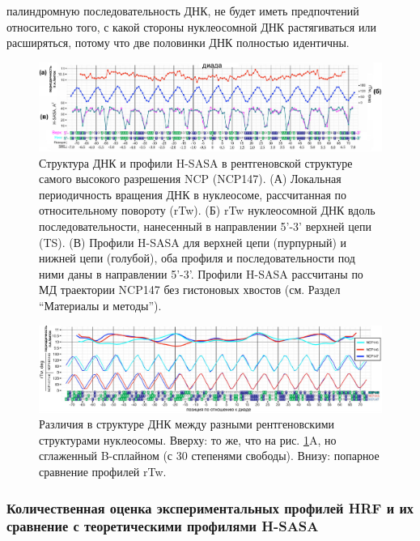 палиндромную последовательность ДНК, не будет иметь предпочтений относительно того, с какой стороны нуклеосомной ДНК растягиваться или расширяться, потому что две половинки ДНК полностью идентичны.

\begin{figure}[H]
    \centering
    \includegraphics[width=\textwidth]{images/p5/part5_2_nar/p5_2_f3.pdf}
    \caption[Структура ДНК и профили H-SASA в рентгеновской структуре самого высокого разрешения NCP (NCP147)]{Структура ДНК и профили H-SASA в рентгеновской структуре самого высокого разрешения NCP (NCP147). (А) Локальная периодичность вращения ДНК в нуклеосоме, рассчитанная по относительному повороту (rTw). (Б) rTw нуклеосомной ДНК вдоль последовательности, нанесенный в направлении 5'-3' верхней цепи (TS). (В) Профили H-SASA для верхней цепи (пурпурный) и нижней цепи (голубой), оба профиля и последовательности под ними даны в направлении 5'-3'. Профили H-SASA рассчитаны по МД траектории NCP147 без гистоновых хвостов (см. Раздел ``Материалы и методы'').}
    \label{fig:p5:p5_2_f3}
\end{figure}

\begin{figure}[H]
    \centering
    \includegraphics[width=\textwidth]{images/p5/part5_2_nar/p5_2_f4.pdf}
    \caption[Различия в структуре ДНК между разными рентгеновскими структурами нуклеосомы.]{Различия в структуре ДНК между разными рентгеновскими структурами нуклеосомы. Вверху: то же, что на рис. \ref{fig:p5:p5_2_f3}A, но сглаженный B-сплайном (с 30 степенями свободы). Внизу: попарное сравнение профилей rTw.}
    \label{fig:p5:p5_2_f4}
\end{figure}

\subsubsection{Количественная оценка экспериментальных профилей HRF и их сравнение с теоретическими профилями H-SASA}

